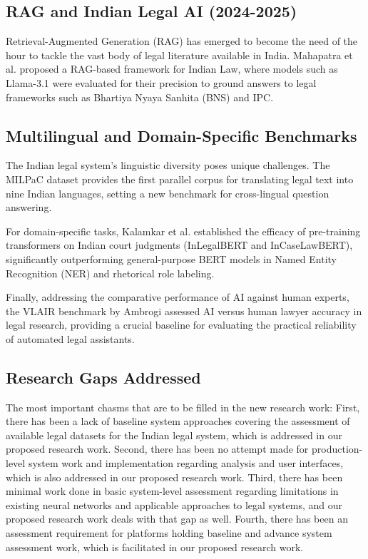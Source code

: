 \documentclass[conference]{IEEEtran}
\begin{document}
\subsection{RAG and Indian Legal AI (2024-2025)}
Retrieval-Augmented Generation (RAG) has emerged to become the need of the hour to tackle the vast body of legal literature available in India. Mahapatra et al. \cite{mahapatra2025redefining} proposed a RAG-based framework for Indian Law, where models such as Llama-3.1 were evaluated for their precision to ground answers to legal frameworks such as Bhartiya Nyaya Sanhita (BNS) and IPC.

\subsection{Multilingual and Domain-Specific Benchmarks}
The Indian legal system's linguistic diversity poses unique challenges. The MILPaC dataset \cite{milpac2025} provides the first parallel corpus for translating legal text into nine Indian languages, setting a new benchmark for cross-lingual question answering. 

For domain-specific tasks, Kalamkar et al. \cite{kalamkar2022ner} established the efficacy of pre-training transformers on Indian court judgments (InLegalBERT and InCaseLawBERT), significantly outperforming general-purpose BERT models in Named Entity Recognition (NER) and rhetorical role labeling.

Finally, addressing the comparative performance of AI against human experts, the VLAIR benchmark by Ambrogi \cite{vlair2025} assessed AI versus human lawyer accuracy in legal research, providing a crucial baseline for evaluating the practical reliability of automated legal assistants.

\subsection{Research Gaps Addressed}
The most important chasms that are to be filled in the new research work: First, there has been a lack of baseline system approaches covering the assessment of available legal datasets for the Indian legal system, which is addressed in our proposed research work. Second, there has been no attempt made for production-level system work and implementation regarding analysis and user interfaces, which is also addressed in our proposed research work. Third, there has been minimal work done in basic system-level assessment regarding limitations in existing neural networks and applicable approaches to legal systems, and our proposed research work deals with that gap as well. Fourth, there has been an assessment requirement for platforms holding baseline and advance system assessment work, which is facilitated in our proposed research work.
\end{document}
